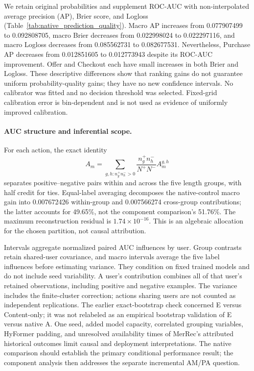 We retain original probabilities and supplement ROC-AUC with non-interpolated
average precision (AP), Brier score, and Logloss
(Table~\ref{tab:native_prediction_quality}). Macro AP increases from 0.077907499
to 0.092808705, macro Brier decreases from 0.022998024 to 0.022297116, and
macro Logloss decreases from 0.085562731 to 0.082677531. Nevertheless, Purchase
AP decreases from 0.012851605 to 0.012773943 despite its ROC-AUC improvement.
Offer and Checkout each have small increases in both Brier and Logloss.
These descriptive differences show that ranking gains do not guarantee uniform
probability-quality gains; they have no new confidence intervals. No calibrator
was fitted and no decision threshold was selected. Fixed-grid calibration error
is bin-dependent and is not used as evidence of uniformly improved calibration.

\paragraph{AUC structure and inferential scope.}
For each action, the exact identity
\begin{equation}
 A_m=\sum_{g,h:n_g^+n_h^->0}
 \frac{n_g^+n_h^-}{N^+N^-}A_m^{g,h}
\end{equation}
separates positive--negative pairs within and across the five length groups,
with half credit for ties. Equal-label averaging decomposes the native-control
macro gain into 0.007672426 within-group and 0.007566274 cross-group contributions;
the latter accounts for 49.65\%, not the component comparison's 51.76\%.
The maximum reconstruction residual is $1.74\times10^{-16}$. This is an
algebraic allocation for the chosen partition, not causal attribution.

Intervals aggregate normalized paired AUC influences by user. Group contrasts
retain shared-user covariance, and macro intervals average the five label
influences before estimating variance. They condition on fixed trained models
and do not include seed variability. A user's contribution combines all of
that user's retained observations, including positive and negative examples.
The variance includes the finite-cluster correction; actions sharing users are
not counted as independent replications. The earlier exact-bootstrap check concerned
E versus Content-only; it was not relabeled as an empirical bootstrap validation
of E versus native A. One seed, added model capacity, correlated grouping variables,
HyFormer padding, and unresolved availability times of MerRec's attributed
historical outcomes limit causal and deployment interpretations. The native
comparison should establish the primary conditional performance result; the
component analysis then addresses the separate incremental AM/PA question.

